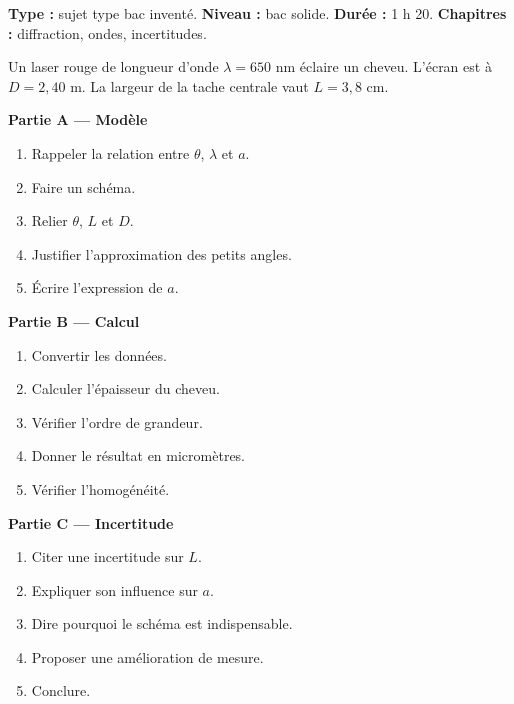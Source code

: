 \documentclass[11pt,a4paper]{article}
\begin{document}
\hypertarget{PC-LONG-05}{}
\begin{sujettype}
\textbf{Type :} sujet type bac inventé.  
\textbf{Niveau :} bac solide.  
\textbf{Durée :} 1 h 20.  
\textbf{Chapitres :} diffraction, ondes, incertitudes.

Un laser rouge de longueur d'onde $\lambda=650$ nm éclaire un cheveu. L'écran est à $D=2{,}40$ m. La largeur de la tache centrale vaut $L=3{,}8$ cm.

\textbf{Partie A — Modèle}
\begin{enumerate}
  \item Rappeler la relation entre $\theta$, $\lambda$ et $a$.
  \item Faire un schéma.
  \item Relier $\theta$, $L$ et $D$.
  \item Justifier l'approximation des petits angles.
  \item Écrire l'expression de $a$.
\end{enumerate}

\textbf{Partie B — Calcul}
\begin{enumerate}
  \item Convertir les données.
  \item Calculer l'épaisseur du cheveu.
  \item Vérifier l'ordre de grandeur.
  \item Donner le résultat en micromètres.
  \item Vérifier l'homogénéité.
\end{enumerate}

\textbf{Partie C — Incertitude}
\begin{enumerate}
  \item Citer une incertitude sur $L$.
  \item Expliquer son influence sur $a$.
  \item Dire pourquoi le schéma est indispensable.
  \item Proposer une amélioration de mesure.
  \item Conclure.
\end{enumerate}
\end{sujettype}
\end{document}
